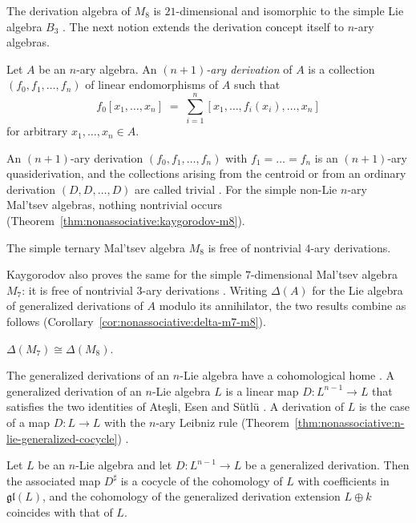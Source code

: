 The derivation algebra of $M_8$ is $21$-dimensional and isomorphic to the
simple Lie algebra $B_3$ \cite[Section~2, p.~3598]{PojidaevSarahva2006}. The
next notion extends the derivation concept itself to $n$-ary algebras.

\begin{definition}
\label{def:nonassociative:n1ary}
Let $A$ be an $n$-ary algebra. An \emph{$(n+1)$-ary derivation} of $A$ is a
collection $(f_0,f_1,\dots,f_n)$ of linear endomorphisms of $A$ such that
\[
f_0[x_1,\dots,x_n]\;=\;\sum_{i=1}^{n}[x_1,\dots,f_i(x_i),\dots,x_n]
\]
for arbitrary $x_1,\dots,x_n\in A$.
\end{definition}

An $(n+1)$-ary derivation $(f_0,f_1,\dots,f_n)$ with $f_1=\dots=f_n$ is an
$(n+1)$-ary quasiderivation, and the collections arising from the centroid or
from an ordinary derivation $(D,D,\dots,D)$ are called trivial
\cite[pp.~576--577]{Kaygorodov2014n1aryMaltsev}. For the simple non-Lie
$n$-ary Mal'tsev algebras, nothing nontrivial occurs
(Theorem~\ref{thm:nonassociative:kaygorodov-m8}).

\begin{theorem}
\label{thm:nonassociative:kaygorodov-m8}
The simple ternary Mal'tsev algebra $M_8$ is free of nontrivial $4$-ary
derivations.
\end{theorem}

Kaygorodov also proves the same for the simple $7$-dimensional Mal'tsev
algebra $M_7$: it is free of nontrivial $3$-ary derivations \cite[Theorem~1,
p.~579]{Kaygorodov2014n1aryMaltsev}. Writing $\Delta(A)$ for the Lie algebra
of generalized derivations of $A$ modulo its annihilator, the two results
combine as follows (Corollary~\ref{cor:nonassociative:delta-m7-m8}).

\begin{corollary}
\label{cor:nonassociative:delta-m7-m8}
$\Delta(M_7)\cong\Delta(M_8)$.
\end{corollary}

The generalized derivations of an $n$-Lie algebra have a cohomological home
\cite[equations~(2.9)--(2.10), p.~12]{AtesliEsenSutlu2021}. A generalized
derivation of an $n$-Lie algebra $L$ is a linear map $D\colon L^{n-1}\to L$
that satisfies the two identities of Ateşli, Esen and Sütlü
\cite[equations~(2.9)--(2.10), p.~12]{AtesliEsenSutlu2021}. A derivation of
$L$ is the case of a map $D\colon L\to L$ with the $n$-ary Leibniz rule
(Theorem~\ref{thm:nonassociative:n-lie-generalized-cocycle})
\cite[p.~12]{AtesliEsenSutlu2021}.\begin{theorem}\label{thm:nonassociative:n-lie-generalized-cocycle}
Let $L$ be an $n$-Lie algebra and let $D\colon L^{n-1}\to L$ be a generalized
derivation. Then the associated map $D^{\sharp}$ is a cocycle of the
cohomology of $L$ with coefficients in $\mathfrak{gl}(L)$, and the cohomology
of the generalized derivation extension $L\oplus k$ coincides with that of
$L$. \end{theorem}

